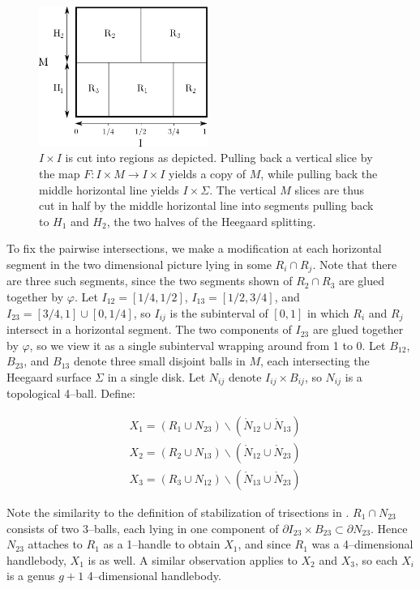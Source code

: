 \documentclass[12pt]{amsart}
\newcommand{\del}{\partial }
\theoremstyle{definition}
\theoremstyle{remark}
\begin{document}
\begin{figure}[h]
\centering
\includegraphics[height=1.8in]{MxS1_flippable.png}
\caption{$I \times I$ is cut into regions as depicted.  Pulling back a vertical slice by the map $F\colon I \times M \to I \times I$ yields a copy of $M$, while pulling back the middle horizontal line yields $I \times \Sigma$.  The vertical $M$ slices are thus cut in half by the middle horizontal line into segments pulling back to $H_1$ and $H_2$, the two halves of the Heegaard splitting.}
\label{flippablebreakdown}
\end{figure}
 
To fix the pairwise intersections, we make a modification at each horizontal segment in the two dimensional picture lying in some $R_i \cap R_j$.  Note that there are three such segments, since the two segments shown of $R_2 \cap R_3$ are glued together by $\varphi$.   Let $I_{12} = [1/4,1/2]$, $I_{13} = [1/2,3/4]$, and $I_{23} = [3/4,1] \cup [0,1/4]$, so $I_{ij}$ is the subinterval of $[0,1]$ in which $R_i$ and $R_j$ intersect in a horizontal segment.  The two components of $I_{23}$ are glued together by $\varphi$, so we view it as a single subinterval wrapping around from 1 to 0.  Let $B_{12}$, $B_{23}$, and $B_{13}$ denote three small disjoint balls in $M$, each intersecting the Heegaard surface $\Sigma$ in a single disk.  Let $N_{ij}$ denote $I_{ij} \times B_{ij}$, so $N_{ij}$ is a topological 4--ball.  Define:

\begin{align*}
&X_1 = (R_1 \cup N_{23}) \backslash (\mathring N_{12} \cup \mathring N_{13}) \\
&X_2 = (R_2 \cup N_{13}) \backslash (\mathring N_{12} \cup \mathring N_{23}) \\
&X_3 = (R_3 \cup N_{12}) \backslash (\mathring N_{13} \cup \mathring N_{23}) 
\end{align*}

Note the similarity to the definition of stabilization of trisections in \cite{GayKirby1}.  $R_1 \cap N_{23}$ consists of two 3--balls, each lying in one component of $\del I_{23} \times B_{23} \subset \del N_{23}$.  Hence $N_{23}$ attaches to $R_1$ as a 1--handle to obtain $X_1$, and since $R_1$ was a 4--dimensional handlebody, $X_1$ is as well.  A similar observation applies to $X_2$ and $X_3$, so each $X_i$ is a genus $g+1$ 4--dimensional handlebody.
\end{document}
